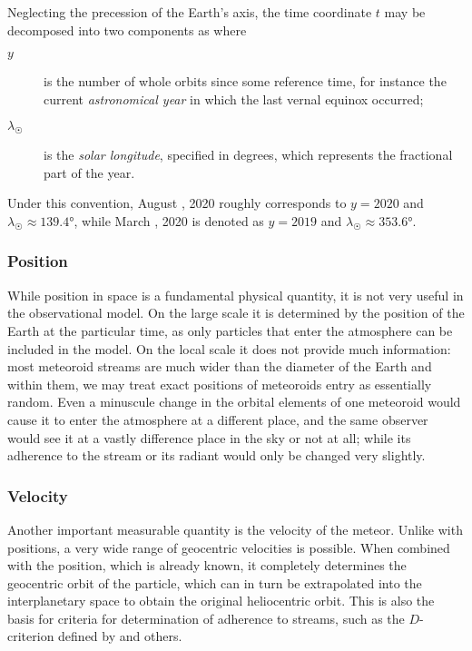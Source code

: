             Neglecting the precession of the Earth's axis, the time coordinate $t$ may be decomposed into two components as
            where
            \begin{description}
                \item[$y$]
                    is the number of whole orbits since some reference time,
                    for instance the current \emph{astronomical year} in which the last vernal equinox occurred;
                \item[$\lambda_\Sun$]
                    is the \emph{solar longitude}, specified in degrees, which represents the fractional part of the year.
            \end{description}

            \begin{example}
                Under this convention, August , 2020 roughly corresponds to $y = 2020$ and $\lambda_\Sun \approx \ang{139.4}$,
                while March , 2020 is denoted as $y = 2019$ and $\lambda_\Sun \approx \ang{353.6}$.
            \end{example}

        \subsubsection{Position} \label{mspp}
            While position in space is a fundamental physical quantity, it is not very useful in the observational model.
            On the large scale it is determined by the position of the Earth at the particular time,
            as only particles that enter the atmosphere can be included in the model.
            On the local scale it does not provide much information: most meteoroid streams
            are much wider than the diameter of the Earth and within them,
            we may treat exact positions of meteoroids entry as essentially random.
            Even a minuscule change in the orbital elements of one meteoroid
            would cause it to enter the atmosphere at a different place,
            and the same observer would see it at a vastly difference place in the sky or not at all;
            while its adherence to the stream or its radiant would only be changed very slightly.

        \subsubsection{Velocity} \label{mspv}
            Another important measurable quantity is the velocity of the meteor.
            Unlike with positions, a very wide range of geocentric velocities is possible.
            When combined with the position, which is already known, it completely determines the geocentric
            orbit of the particle, which can in turn be extrapolated into the interplanetary space
            to obtain the original heliocentric orbit.
            This is also the basis for criteria for determination of adherence to streams,
            such as the $D$-criterion defined by \citet{southworth+1963} and others.

